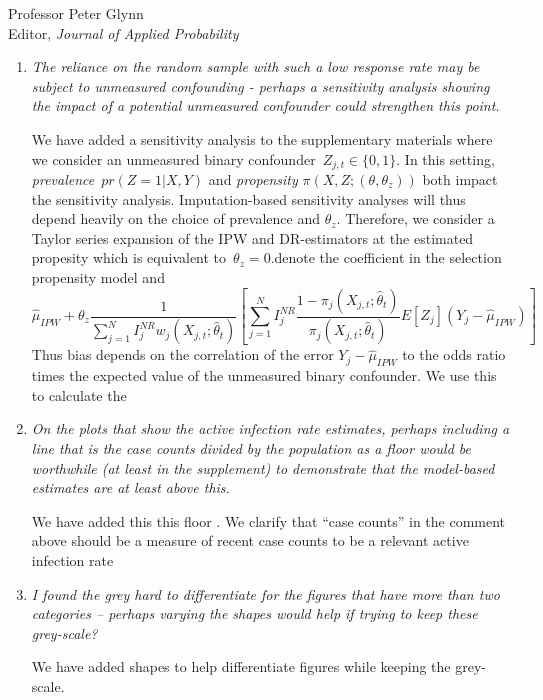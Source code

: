 \documentclass[11pt]{letter} %
\begin{document}
\begin{letter}{Professor
	Peter Glynn\\
	Editor, {\em Journal of Applied Probability}}
\begin{enumerate}
\item {\it The reliance on the random sample with such a low response rate may be subject to unmeasured confounding - perhaps a sensitivity analysis showing the impact of a potential unmeasured confounder could strengthen this point.}

\vspace{5mm}
We have added a sensitivity analysis to the supplementary materials where we consider an unmeasured binary confounder~$Z_{j,t} \in \{0,1\}$.  In this setting, {\it prevalence}~$pr(Z=1|X,Y)$ and {\it propensity} $\pi(X, Z; (\theta,\theta_z))$ both impact the sensitivity analysis.  Imputation-based sensitivity analyses will thus depend heavily on the choice of prevalence and $\theta_z$.    Therefore, we consider a Taylor series expansion of the IPW and DR-estimators at the estimated propesity which is equivalent to~$\theta_z = 0$.denote the coefficient in the selection propensity model and
$$
\hat \mu_{IPW} + \theta_z \frac{1}{\sum_{j=1}^N I^{NR}_j w_j (X_{j,t}; \hat \theta_t)} \left[ \sum_{j=1}^N I^{NR}_j \frac{1-\pi_j(X_{j,t}; \hat \theta_t)}{\pi_j(X_{j,t}; \hat \theta_t)} E[Z_j] (Y_j - \hat \mu_{IPW}) \right]
$$
Thus bias depends on the correlation of the error $Y_j - \hat \mu_{IPW}$ to the odds ratio times the expected value of the unmeasured binary confounder.  We use this to calculate the

\vspace{5mm}

\item {\it On the plots that show the active infection rate estimates, perhaps including a line that is the case counts divided by the population as a floor would be worthwhile (at least in the supplement) to demonstrate that the model-based estimates are at least above this.}

\vspace{5mm}
We have added this this floor .  We clarify that ``case counts'' in the comment above should be a measure of recent case counts to be a relevant  active infection rate
\vspace{5mm}

\item {\it I found the grey hard to differentiate for the figures that have more than two categories – perhaps varying the shapes would help if trying to keep these grey-scale?}

\vspace{5mm}
We have added shapes to help differentiate figures while keeping the grey-scale.
\vspace{5mm}

\end{enumerate}


\end{letter}
\end{document}
